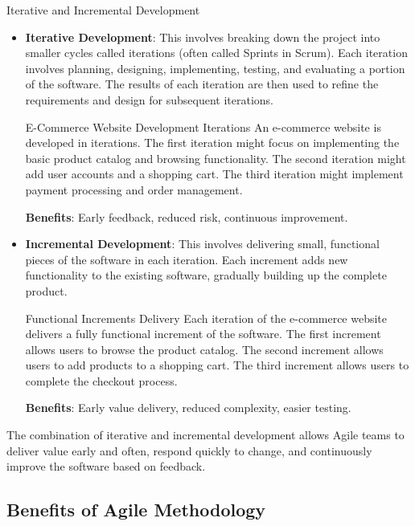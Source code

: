 \begin{conceptcard}{Iterative and Incremental Development}
  \begin{itemize}
    \item \textbf{Iterative Development}: This involves breaking down the project into smaller cycles called iterations (often called Sprints in Scrum). Each iteration involves planning, designing, implementing, testing, and evaluating a portion of the software. The results of each iteration are then used to refine the requirements and design for subsequent iterations.

          \begin{examplecard}{E-Commerce Website Development Iterations}
            An e-commerce website is developed in iterations. The first iteration might focus on implementing the basic product catalog and browsing functionality. The second iteration might add user accounts and a shopping cart. The third iteration might implement payment processing and order management.
          \end{examplecard}

          \textbf{Benefits}: Early feedback, reduced risk, continuous improvement.

    \item \textbf{Incremental Development}: This involves delivering small, functional pieces of the software in each iteration. Each increment adds new functionality to the existing software, gradually building up the complete product.

          \begin{examplecard}{Functional Increments Delivery}
            Each iteration of the e-commerce website delivers a fully functional increment of the software. The first increment allows users to browse the product catalog. The second increment allows users to add products to a shopping cart. The third increment allows users to complete the checkout process.
          \end{examplecard}

          \textbf{Benefits}: Early value delivery, reduced complexity, easier testing.
  \end{itemize}
\end{conceptcard}

The combination of iterative and incremental development allows Agile teams to
deliver value early and often, respond quickly to change, and continuously
improve the software based on feedback.

\subsection{Benefits of Agile Methodology}

